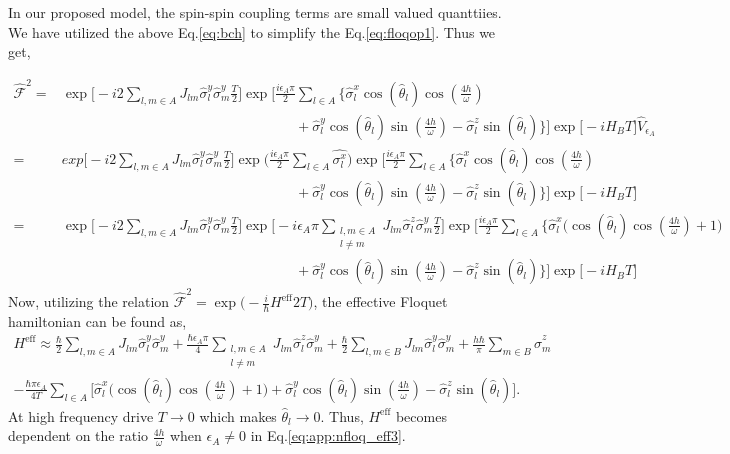 \documentclass[%
reprint,
superscriptaddress,
amsmath,amssymb,showkeys,
aps,
prb,
]{revtex4-2}
\begin{document}
In our proposed model, the spin-spin coupling terms are small valued quanttiies. We have utilized the above Eq.\eqref{eq:bch} to simplify the Eq.\eqref{eq:floqop1}. Thus we get,

\begin{align}
	\hat{\mathcal{F}}^2 
		=& \exp\Bigg[-i 2 \sum_{l,m\in A}J_{lm} \hat{\sigma}^y_l\hat{\sigma}^y_m\frac{T}{2}\Bigg]\exp\Bigg[\frac{i \epsilon_A \pi}{2}\sum_{l\in A}\Big\{\hat{\sigma}^x_l \cos(\hat{\theta}_l)\cos(\frac{4h}{\omega})\nonumber\\
		&\hspace{7cm}+ \hat{\sigma}^y_l \cos(\hat{\theta}_l)\sin(\frac{4h}{\omega})-\hat{\sigma}^z_l \sin(\hat{\theta}_l)\Big\}\Bigg] \exp\big[-i H_B T\big]\hat{V}_{\epsilon_A}\nonumber\\
		=&exp\Bigg[-i 2\sum_{l,m\in A}J_{lm} \hat{\sigma}_l^y\hat{\sigma}_m^y\frac{T}{2}\Bigg] \exp\Big(\frac{i\epsilon_A \pi}{2}\sum_{l\in A}\hat{\sigma^x_l}\Big) \exp\Bigg[\frac{i \epsilon_A \pi}{2}\sum_{l\in A}\Big\{\hat{\sigma}^x_l \cos(\hat{\theta}_l)\cos(\frac{4h}{\omega})\nonumber\\
		&\hspace{ 7cm}  +\hat{\sigma}^y_l \cos(\hat{\theta}_l)\sin(\frac{4h}{\omega})-\hat{\sigma}^z_l \sin(\hat{\theta}_l)\Big\}\Bigg]\exp\big[-i H_B T\big]\nonumber\\
		=&\exp\Bigg[-i2\sum_{l,m\in A}J_{lm}\hat{\sigma}^y_l\hat{\sigma}^y_m \frac{T}{2}\Bigg] \exp\Bigg[-i\epsilon_A \pi \sum_{\substack{l,m \in A\\l\neq m}}J_{lm} \hat{\sigma}^z_l\hat{\sigma}^y_m\frac{T}{2}\Bigg] \exp\Bigg[\frac{i \epsilon_A \pi}{2}\sum_{l\in A}\Bigg\{\hat{\sigma}^x_l\Bigg( \cos(\hat{\theta}_l)\cos(\frac{4h}{\omega})+1\Bigg)\nonumber\\
		&\hspace{7cm} +\hat{\sigma}^y_l \cos(\hat{\theta}_l)\sin(\frac{4h}{\omega})-\hat{\sigma}^z_l \sin(\hat{\theta}_l)\Bigg\}\Bigg] \exp\big[-i H_B T\big]
		\label{eq:floq_couple1}
	\end{align}
	Now, utilizing the relation $\displaystyle \hat{\mathcal{F}}^2 = \exp\Big(-\frac{i}{\hbar}H^{\mathrm{eff}}2T\Big)$, the effective Floquet hamiltonian can be found as,
	\begin{multline}
		H^{\mathrm{eff}} \approx\frac{\hbar}{2} \sum_{l,m\in A}J_{lm}\hat{\sigma}_l^y\hat{\sigma}_m^y +\frac{\hbar \epsilon_A \pi}{4} \sum_{\substack{l,m\in A\\l\neq m}} J_{lm}\hat{\sigma}^z_l\hat{\sigma}^y_m + \frac{\hbar}{2}\sum_{l,m\in B}J_{lm}\hat{\sigma}_l^y \hat{\sigma}_m^y + \frac{h\hbar}{\pi}\sum_{m \in B}\hat{\sigma}^z_m \\ -\frac{\hbar \pi \epsilon_A}{4T}\sum_{l\in A}\Bigg[\hat{\sigma}^x_l \Bigg(\cos(\hat{\theta}_l)\cos(\frac{4h}{\omega})+1 \Bigg) + \hat{\sigma}^y_l \cos(\hat{\theta}_l)\sin(\frac{4h}{\omega})-\hat{\sigma}^z_l \sin(\hat{\theta}_l)\Bigg].
		\label{eq:app:nfloq_eff3}
	\end{multline}
	At high frequency drive $T\rightarrow 0$ which makes $\hat{\theta}_l \rightarrow 0$. Thus, $H^{\mathrm{eff}}$ becomes dependent on the ratio $\frac{4h}{\omega}$ when $\epsilon_A \neq 0$ in Eq.\eqref{eq:app:nfloq_eff3}.
	
	
	
\end{document}
